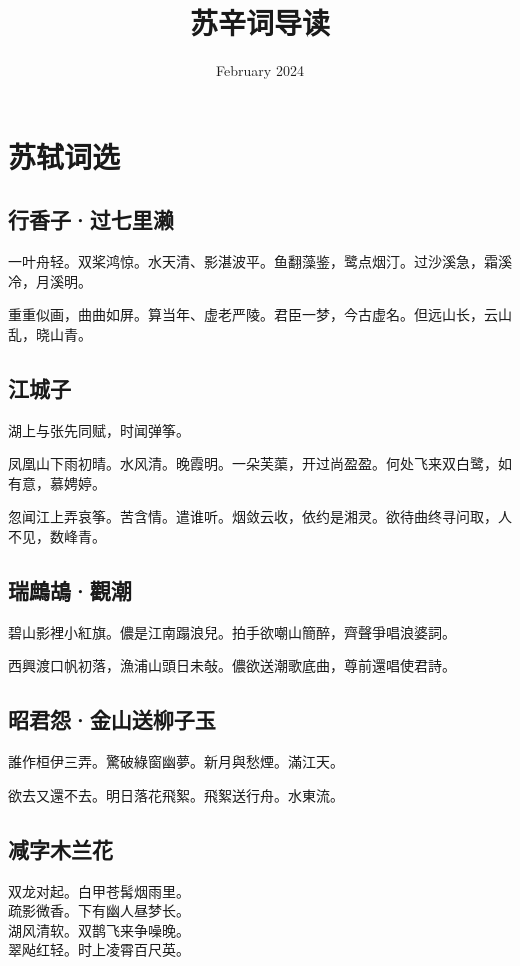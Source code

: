 \documentclass[a5paper]{ctexart}
\title{\textbf{苏辛词导读}}
\author{}
\date{February 2024}
\begin{document}
	\maketitle
	\newpage
	\tableofcontents
	
	\newpage
	\section{苏轼词选}
	
	\subsection{行香子·过七里濑}
	一叶舟轻。双桨鸿惊。水天清、影湛波平。鱼翻藻鉴，鹭点烟汀。过沙溪急，霜溪冷，月溪明。
	
	重重似画，曲曲如屏。算当年、虚老严陵。君臣一梦，今古虚名。但远山长，云山乱，晓山青。
	
	\subsection{江城子}
	\begin{small}
		湖上与张先同赋，时闻弹筝。
	\end{small}
	
	凤凰山下雨初晴。水风清。晚霞明。一朵芙蕖，开过尚盈盈。何处飞来双白鹭，如有意，慕娉婷。
	
	忽闻江上弄哀筝。苦含情。遣谁听。烟敛云收，依约是湘灵。欲待曲终寻问取，人不见，数峰青。
	
	\subsection{瑞鷓鴣·觀潮}
	碧山影裡小紅旗。儂是江南蹋浪兒。拍手欲嘲山簡醉，齊聲爭唱浪婆詞。
	
	西興渡口帆初落，漁浦山頭日未敧。儂欲送潮歌底曲，尊前還唱使君詩。
	
	\subsection{昭君怨·金山送柳子玉}
	誰作桓伊三弄。驚破綠窗幽夢。新月與愁煙。滿江天。
	
	欲去又還不去。明日落花飛絮。飛絮送行舟。水東流。
	
	\subsection{减字木兰花}
	\begin{center}
		双龙对起。白甲苍髯烟雨里。\\
		疏影微香。下有幽人昼梦长。\\
		湖风清软。双鹊飞来争噪晚。\\
		翠飐红轻。时上凌霄百尺英。
	\end{center}
	
\end{document}
